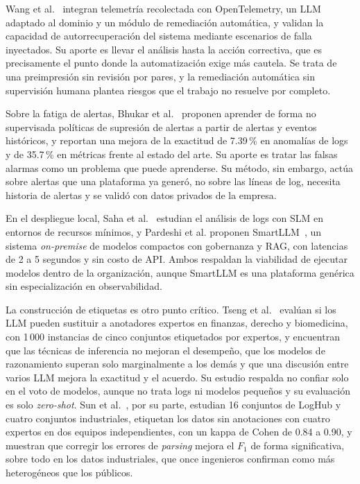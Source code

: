 Wang et al.~\cite{wang2025_cloudnative_rca} integran telemetría recolectada con OpenTelemetry, un LLM adaptado al dominio y un módulo de remediación automática, y validan la capacidad de autorrecuperación del sistema mediante escenarios de falla inyectados. Su aporte es llevar el análisis hasta la acción correctiva, que es precisamente el punto donde la automatización exige más cautela. Se trata de una preimpresión sin revisión por pares, y la remediación automática sin supervisión humana plantea riesgos que el trabajo no resuelve por completo.

Sobre la fatiga de alertas, Bhukar et al.~\cite{bhukar2024_alertsuppression} proponen aprender de forma no supervisada políticas de supresión de alertas a partir de alertas y eventos históricos, y reportan una mejora de la exactitud de 7.39\,\% en anomalías de logs y de 35.7\,\% en métricas frente al estado del arte. Su aporte es tratar las falsas alarmas como un problema que puede aprenderse. Su método, sin embargo, actúa sobre alertas que una plataforma ya generó, no sobre las líneas de log, necesita historia de alertas y se validó con datos privados de la empresa.

En el despliegue local, Saha et al.~\cite{saha2025_slm_minimal} estudian el análisis de logs con SLM en entornos de recursos mínimos, y Pardeshi et al. proponen SmartLLM~\cite{pardeshi2026_smartllm}, un sistema \textit{on-premise} de modelos compactos con gobernanza y RAG, con latencias de 2 a 5 segundos y sin costo de API. Ambos respaldan la viabilidad de ejecutar modelos dentro de la organización, aunque SmartLLM es una plataforma genérica sin especialización en observabilidad.

La construcción de etiquetas es otro punto crítico. Tseng et al.~\cite{tseng2025_expert_annotators} evalúan si los LLM pueden sustituir a anotadores expertos en finanzas, derecho y biomedicina, con 1\,000 instancias de cinco conjuntos etiquetados por expertos, y encuentran que las técnicas de inferencia no mejoran el desempeño, que los modelos de razonamiento superan solo marginalmente a los demás y que una discusión entre varios LLM mejora la exactitud y el acuerdo. Su estudio respalda no confiar solo en el voto de modelos, aunque no trata logs ni modelos pequeños y su evaluación es solo \textit{zero-shot}. Sun et al.~\cite{sun2026_parsing}, por su parte, estudian 16 conjuntos de LogHub y cuatro conjuntos industriales, etiquetan los datos sin anotaciones con cuatro expertos en dos equipos independientes, con un kappa de Cohen de 0.84 a 0.90, y muestran que corregir los errores de \textit{parsing} mejora el $F_1$ de forma significativa, sobre todo en los datos industriales, que once ingenieros confirman como más heterogéneos que los públicos.

